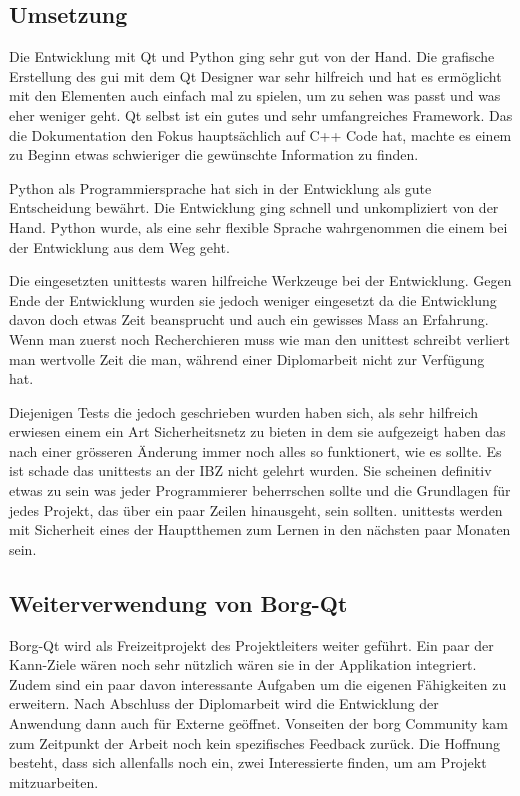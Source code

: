 \subsection{Umsetzung}
\label{sec:org52897fb}

Die Entwicklung mit Qt und Python ging sehr gut von der Hand. Die grafische
Erstellung des \gls{gui} mit dem Qt Designer war sehr hilfreich und hat es
ermöglicht mit den Elementen auch einfach mal zu spielen, um zu sehen was passt
und was eher weniger geht. Qt selbst ist ein gutes und sehr umfangreiches
Framework. Das die Dokumentation den Fokus hauptsächlich auf C++ Code hat,
machte es einem zu Beginn etwas schwieriger die gewünschte Information zu
finden.

Python als Programmiersprache hat sich in der Entwicklung als gute Entscheidung
bewährt. Die Entwicklung ging schnell und unkompliziert von der Hand. Python
wurde, als eine sehr flexible Sprache wahrgenommen die einem bei der Entwicklung
aus dem Weg geht.

Die eingesetzten \glspl{unittest} waren hilfreiche Werkzeuge bei der Entwicklung.
Gegen Ende der Entwicklung wurden sie jedoch weniger eingesetzt da die
Entwicklung davon doch etwas Zeit beansprucht und auch ein gewisses Mass an
Erfahrung. Wenn man zuerst noch Recherchieren muss wie man den \gls{unittest}
schreibt verliert man wertvolle Zeit die man, während einer Diplomarbeit nicht
zur Verfügung hat.

Diejenigen Tests die jedoch geschrieben wurden haben sich, als sehr hilfreich
erwiesen einem ein Art Sicherheitsnetz zu bieten in dem sie aufgezeigt haben
das nach einer grösseren Änderung immer noch alles so funktionert, wie es
sollte. Es ist schade das \glspl{unittest} an der IBZ nicht gelehrt wurden. Sie
scheinen definitiv etwas zu sein was jeder Programmierer beherrschen sollte und
die Grundlagen für jedes Projekt, das über ein paar Zeilen hinausgeht, sein
sollten. \glspl{unittest} werden mit Sicherheit eines der Hauptthemen zum Lernen in
den nächsten paar Monaten sein.

\subsection{Weiterverwendung von Borg-Qt}
\label{sec:orge5ea08e}

Borg-Qt wird als Freizeitprojekt des Projektleiters weiter geführt. Ein paar
der Kann-Ziele wären noch sehr nützlich wären sie in der Applikation
integriert. Zudem sind ein paar davon interessante Aufgaben um die eigenen
Fähigkeiten zu erweitern. Nach Abschluss der Diplomarbeit wird die Entwicklung
der Anwendung dann auch für Externe geöffnet. Vonseiten der \gls{borg} Community
kam zum Zeitpunkt der Arbeit noch kein spezifisches Feedback zurück. Die
Hoffnung besteht, dass sich allenfalls noch ein, zwei Interessierte finden, um
am Projekt mitzuarbeiten.

